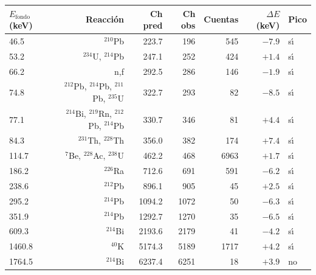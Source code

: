 \documentclass[12pt,a4paper]{article}
\begin{document}
\medskip
\begin{center}
\footnotesize
\begin{tabular}{lrrrrrl}
\hline
$E_{\text{fondo}}$ (keV) & Reacci\'on & Ch pred & Ch obs & Cuentas & $\Delta E$ (keV) & Pico \\
\hline
46.5  & $^{210}$Pb            & 223.7 & 196 & 545 & $-7.9$ & s\'{\i} \\
53.2  & $^{234}$U, $^{214}$Pb & 247.1 & 252 & 424 & $+1.4$ & s\'{\i} \\
66.2  & n,f                   & 292.5 & 286 & 146 & $-1.9$ & s\'{\i} \\
74.8  & $^{212}$Pb, $^{214}$Pb, $^{211}$Pb, $^{235}$U & 322.7 & 293 & 82 & $-8.5$ & s\'{\i} \\
77.1  & $^{214}$Bi, $^{219}$Rn, $^{212}$Pb, $^{214}$Pb & 330.7 & 346 & 81 & $+4.4$ & s\'{\i} \\
84.3  & $^{231}$Th, $^{228}$Th & 356.0 & 382 & 174 & $+7.4$ & s\'{\i} \\
114.7 & $^{7}$Be, $^{228}$Ac, $^{238}$U & 462.2 & 468 & 6963 & $+1.7$ & s\'{\i} \\
186.2 & $^{226}$Ra            & 712.6 & 691 & 591 & $-6.2$ & s\'{\i} \\
238.6 & $^{212}$Pb            & 896.1 & 905 & 45 & $+2.5$ & s\'{\i} \\
295.2 & $^{214}$Pb            & 1094.2 & 1072 & 50 & $-6.3$ & s\'{\i} \\
351.9 & $^{214}$Pb            & 1292.7 & 1270 & 35 & $-6.5$ & s\'{\i} \\
609.3 & $^{214}$Bi            & 2193.6 & 2179 & 41 & $-4.2$ & s\'{\i} \\
1460.8 & $^{40}$K             & 5174.3 & 5189 & 1717 & $+4.2$ & s\'{\i} \\
1764.5 & $^{214}$Bi           & 6237.4 & 6251 & 18 & $+3.9$ & no \\
\hline
\end{tabular}
\end{center}
\medskip
\end{document}
